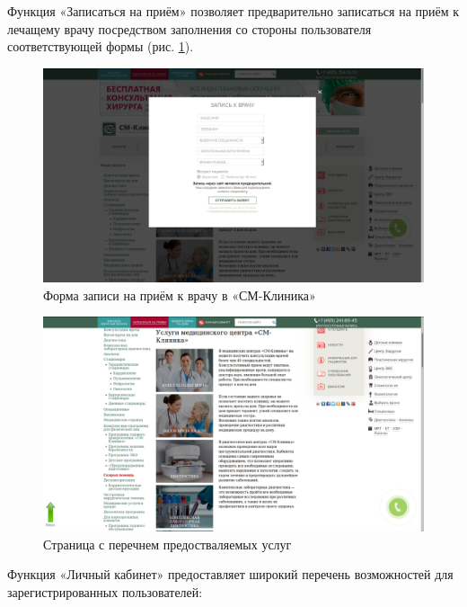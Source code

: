 \documentclass[14pt,a4paper,russian]{extreport}
\begin{document}
Функция «Записаться на приём» позволяет предварительно записаться на приём к лечащему врачу посредством заполнения
со стороны пользователя соответствующей формы (рис. \ref{fig:appdoc}).

\begin{figure}[t!]
        \includegraphics[width=\textwidth]{appdoc}
        \caption{Форма записи на приём к врачу в «СМ-Клиника»}
        \label{fig:appdoc}
\end{figure}
\begin{figure}[t!]
        \includegraphics[width=\textwidth]{lkcm}
        \caption{Страница с перечнем предостваляемых услуг}
        \label{fig:lkcm}
\end{figure}

Функция «Личный кабинет» предоставляет широкий перечень возможностей для зарегистрированных
пользователей:
\end{document}
